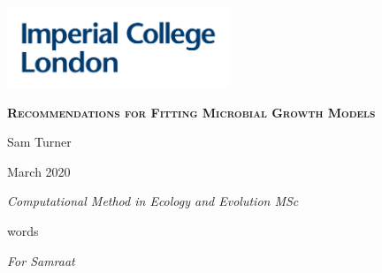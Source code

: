 \documentclass[11pt, a4paper]{article}
\newcommand\wordcount{}
\begin{document}
    \begin{titlepage}
	\centering
	\includegraphics[width=0.5\textwidth]{../data/imperial.png}\par\vspace{1cm}
	\vspace{2cm}
	{\scshape\Large\bfseries Recommendations for Fitting Microbial Growth Models\par}
	\vspace{2cm}
	{\Large Sam Turner\par}
	\vspace{0.5cm}
	{\Large March 2020 \par}
	\vspace{0.5cm}
	{\Large\itshape Computational Method in Ecology and Evolution MSc\par}
	\vspace{0.5cm}
	 \wordcount words 
	\vfill

	\vfill
    
    \newpage
    \end{titlepage}
    
    \vspace*{\fill}
\begin{center}
{\it For Samraat}
\end{center}
\vspace*{\fill}
        \newpage
\end{document}
